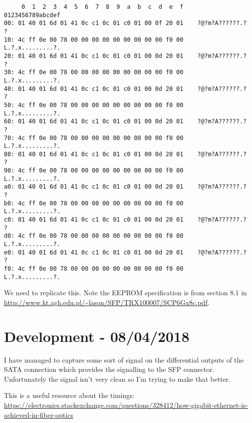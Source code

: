 \begin{lstlisting}
     0  1  2  3  4  5  6  7  8  9  a  b  c  d  e  f    0123456789abcdef
00: 01 40 01 6d 01 41 0c c1 0c 01 c0 01 00 0f 20 01    ?@?m?A??????.? ?
10: 4c ff 0e 00 78 00 00 00 00 00 00 00 00 00 f0 00    L.?.x.........?.
20: 01 40 01 6d 01 41 0c c1 0c 01 c0 01 00 0d 20 01    ?@?m?A??????.? ?
30: 4c ff 0e 00 78 00 00 00 00 00 00 00 00 00 f0 00    L.?.x.........?.
40: 01 40 01 6d 01 41 0c c1 0c 01 c0 01 00 0d 20 01    ?@?m?A??????.? ?
50: 4c ff 0e 00 78 00 00 00 00 00 00 00 00 00 f0 00    L.?.x.........?.
60: 01 40 01 6d 01 41 0c c1 0c 01 c0 01 00 0d 20 01    ?@?m?A??????.? ?
70: 4c ff 0e 00 78 00 00 00 00 00 00 00 00 00 f0 00    L.?.x.........?.
80: 01 40 01 6d 01 41 0c c1 0c 01 c0 01 00 0d 20 01    ?@?m?A??????.? ?
90: 4c ff 0e 00 78 00 00 00 00 00 00 00 00 00 f0 00    L.?.x.........?.
a0: 01 40 01 6d 01 41 0c c1 0c 01 c0 01 00 0d 20 01    ?@?m?A??????.? ?
b0: 4c ff 0e 00 78 00 00 00 00 00 00 00 00 00 f0 00    L.?.x.........?.
c0: 01 40 01 6d 01 41 0c c1 0c 01 c0 01 00 0d 20 01    ?@?m?A??????.? ?
d0: 4c ff 0e 00 78 00 00 00 00 00 00 00 00 00 f0 00    L.?.x.........?.
e0: 01 40 01 6d 01 41 0c c1 0c 01 c0 01 00 0d 20 01    ?@?m?A??????.? ?
f0: 4c ff 0e 00 78 00 00 00 00 00 00 00 00 00 f0 00    L.?.x.........?.
\end{lstlisting}

We need to replicate this. Note the EEPROM specification is from section 8.1
in \url{http://www.kt.agh.edu.pl/~lason/SFP/TRX100007/SCP6Gx8c.pdf}.

\section{Development - 08/04/2018}
I have managed to capture some sort of signal on the differential outputs
of the SATA connection which provides the signalling to the \ac{SFP} connector.
Unfortunately the signal isn't very clean so I'm trying to make that better.

This is a useful resource about the timings:
\url{https://electronics.stackexchange.com/questions/328412/how-gigabit-ethernet-is-achieved-in-fiber-optics}
